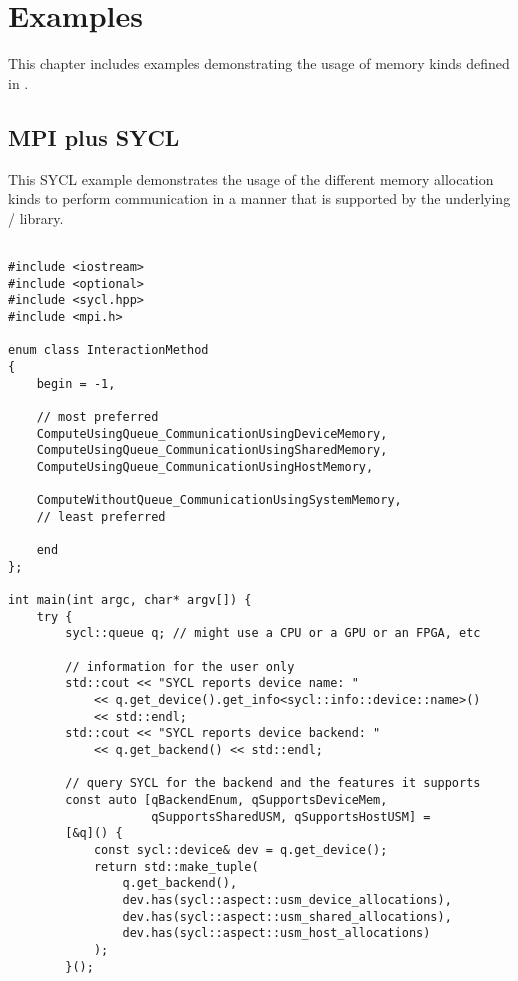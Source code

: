 \chapter{Examples}
\label{chap:examples}

This chapter includes examples demonstrating the usage of
memory kinds defined in .

\section{MPI plus SYCL}

\begin{example}
\label{example:alloc-kind-spm-sycl}
This SYCL example demonstrates the usage of the different
memory allocation kinds to perform communication in a manner
that is supported by the underlying \mpi/ library.
\begin{lstlisting}[language={[MPI]C++}]

#include <iostream>
#include <optional>
#include <sycl.hpp>
#include <mpi.h>

enum class InteractionMethod
{
    begin = -1,

    // most preferred
    ComputeUsingQueue_CommunicationUsingDeviceMemory,
    ComputeUsingQueue_CommunicationUsingSharedMemory,
    ComputeUsingQueue_CommunicationUsingHostMemory,

    ComputeWithoutQueue_CommunicationUsingSystemMemory,
    // least preferred

    end
};

int main(int argc, char* argv[]) {
    try {
        sycl::queue q; // might use a CPU or a GPU or an FPGA, etc

        // information for the user only
        std::cout << "SYCL reports device name: "
            << q.get_device().get_info<sycl::info::device::name>()
            << std::endl;
        std::cout << "SYCL reports device backend: "
            << q.get_backend() << std::endl;

        // query SYCL for the backend and the features it supports
        const auto [qBackendEnum, qSupportsDeviceMem,
                    qSupportsSharedUSM, qSupportsHostUSM] =
        [&q]() {
            const sycl::device& dev = q.get_device();
            return std::make_tuple(
                q.get_backend(),
                dev.has(sycl::aspect::usm_device_allocations),
                dev.has(sycl::aspect::usm_shared_allocations),
                dev.has(sycl::aspect::usm_host_allocations)
            );
        }();


\end{lstlisting}
\end{example}
